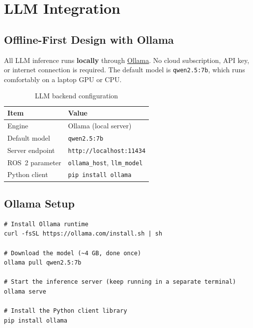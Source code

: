 \documentclass[12pt,a4paper]{report}
\begin{document}
\chapter{LLM Integration}
\label{ch:llm}

\section{Offline-First Design with Ollama}

All LLM inference runs \textbf{locally} through
\href{https://ollama.com}{Ollama}.  No cloud subscription, API key, or
internet connection is required.  The default model is
\texttt{qwen2.5:7b}, which runs comfortably on a laptop GPU or CPU.

\begin{table}[H]
  \centering
  \caption{LLM backend configuration}
  \begin{tabularx}{\linewidth}{L{4cm} X}
    \toprule
    \textbf{Item} & \textbf{Value} \\
    \midrule
    Engine              & Ollama (local server) \\
    Default model       & \texttt{qwen2.5:7b} \\
    Server endpoint     & \texttt{http://localhost:11434} \\
    ROS~2 parameter     & \texttt{ollama\_host}, \texttt{llm\_model} \\
    Python client       & \texttt{pip install ollama} \\
    \bottomrule
  \end{tabularx}
\end{table}

\section{Ollama Setup}

\begin{lstlisting}[style=bashstyle, caption={One-time Ollama installation and model download}]
# Install Ollama runtime
curl -fsSL https://ollama.com/install.sh | sh

# Download the model (~4 GB, done once)
ollama pull qwen2.5:7b

# Start the inference server (keep running in a separate terminal)
ollama serve

# Install the Python client library
pip install ollama
\end{lstlisting}
\end{document}
